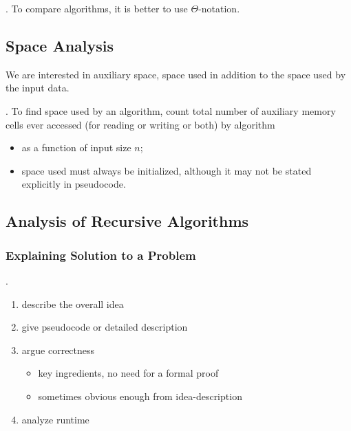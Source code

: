 \documentclass{article}
\begin{document}
\begin{algo}[].
    To compare algorithms, it is better to use $\Theta$-notation. 
\end{algo}

\newpage

\subsection{Space Analysis}

We are interested in auxiliary space, space used in addition to the space used by the input data. 

\begin{algo}[].
    To find space used by an algorithm, count total number of auxiliary memory cells  ever accessed (for reading or writing or both) by  algorithm \begin{itemize}
        \item as a function of input size $n$; 
        \item space used must always be initialized, although it may not be stated explicitly in pseudocode. 
    \end{itemize}  
\end{algo}

\subsection{Analysis of Recursive Algorithms} 

\subsubsection{Explaining Solution to a Problem}

\begin{algo}[].
    \begin{enumerate}
        \item describe the overall idea 
        \item give pseudocode or detailed description 
        \item argue correctness \begin{itemize}
            \item key ingredients, no need for a formal proof
            \item sometimes obvious enough from idea-description
        \end{itemize} 
        \item analyze runtime
    \end{enumerate}
\end{algo}
\end{document}
